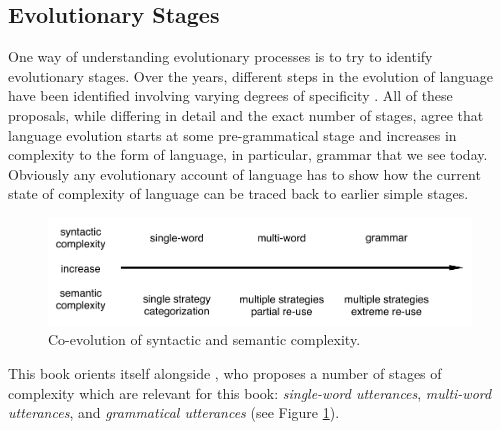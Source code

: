 \subsection{Evolutionary Stages}
\label{s:stages}
One way of understanding evolutionary processes is to try to identify
evolutionary stages. Over the years, different steps in the evolution
of language have been identified involving varying degrees of 
specificity \citep{bickerton1999language,jackendoff1999possible,steels2005emergence}. 
All of these proposals, while differing in detail and the exact number of stages,
agree that language evolution starts at some pre-grammatical stage and 
increases in complexity to the form of language, in particular, grammar 
that we see today. Obviously any evolutionary account of language has to show how 
the current state of complexity of language can be traced back to earlier simple stages. 


\begin{figure}
\includegraphics[width=1\columnwidth]{figs/co-evolution-complexity}
\caption[Co-evolution of syntactic and semantic complexity.]{Co-evolution of syntactic and semantic complexity.}
\label{f:co-evolution-complexity}
\end{figure}

This book orients itself alongside \cite{steels2005emergence}, who proposes
a number of stages of complexity which are relevant for this book:
\emph{single-word utterances}, \emph{multi-word utterances}, and \emph{grammatical utterances}
(see Figure \ref{f:co-evolution-complexity}). 
 
